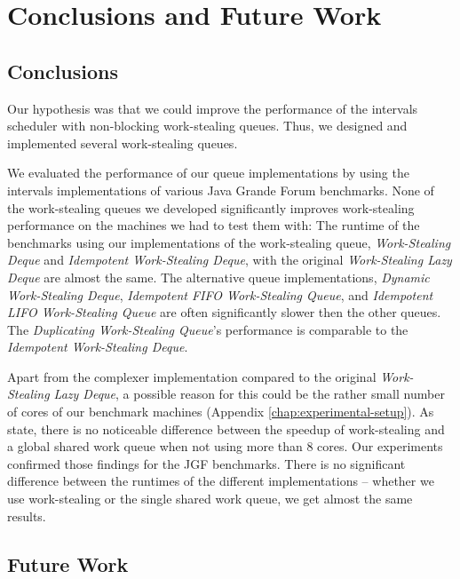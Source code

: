 
\chapter{Conclusions and Future Work}
\label{chap:queues-conclusions-and-future-work}

\section{Conclusions}
\label{sec:queues-conclusions-and-future-work-conclusions}

Our hypothesis was that we could improve the performance of the
intervals scheduler with non-blocking work-stealing queues. Thus, we
designed and implemented several work-stealing queues.

We evaluated the performance of our queue implementations by using the
intervals implementations of various Java Grande Forum
benchmarks. None of the work-stealing queues we developed
significantly improves work-stealing performance on the machines we
had to test them with: The runtime of the benchmarks using our
implementations of the work-stealing queue, \emph{Work-Stealing Deque}
and \emph{Idempotent Work-Stealing Deque}, with the original
\emph{Work-Stealing Lazy Deque} are almost the same. The alternative
queue implementations, \emph{Dynamic Work-Stealing Deque},
\emph{Idempotent FIFO Work-Stealing Queue}, and \emph{Idempotent LIFO
  Work-Stealing Queue} are often significantly slower then the other
queues. The \emph{Duplicating Work-Stealing Queue}'s performance is
comparable to the \emph{Idempotent Work-Stealing Deque}.

Apart from the complexer implementation compared to the original
\emph{Work-Stealing Lazy Deque}, a possible reason for this could be
the rather small number of cores of our benchmark machines (Appendix
\ref{chap:experimental-setup}). As \textcite{Saha2007} state, there is
no noticeable difference between the speedup of work-stealing and a
global shared work queue when not using more than 8 cores. Our
experiments confirmed those findings for the JGF benchmarks. There is
no significant difference between the runtimes of the different
implementations -- whether we use work-stealing or the single shared
work queue, we get almost the same results.


\section{Future Work}
\label{sec:queues-conclusions-and-future-work-future-work}

